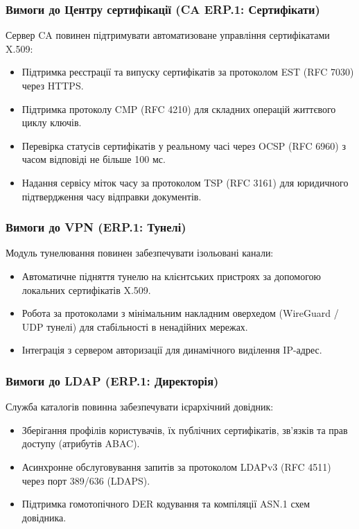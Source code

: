 \documentclass{article}
\begin{document}
\subsubsection{Вимоги до Центру сертифікації (CA ERP.1: Сертифікати)}
Сервер CA повинен підтримувати автоматизоване управління сертифікатами X.509:
\begin{itemize}
    \item Підтримка реєстрації та випуску сертифікатів за протоколом EST (RFC 7030) через HTTPS.
    \item Підтримка протоколу CMP (RFC 4210) для складних операцій життєвого циклу ключів.
    \item Перевірка статусів сертифікатів у реальному часі через OCSP (RFC 6960) з часом відповіді не більше 100 мс.
    \item Надання сервісу міток часу за протоколом TSP (RFC 3161) для юридичного підтвердження часу відправки документів.
\end{itemize}

\subsubsection{Вимоги до VPN (ERP.1: Тунелі)}
Модуль тунелювання повинен забезпечувати ізольовані канали:
\begin{itemize}
    \item Автоматичне підняття тунелю на клієнтських пристроях за допомогою локальних сертифікатів X.509.
    \item Робота за протоколами з мінімальним накладним оверхедом (WireGuard / UDP тунелі) для стабільності в ненадійних мережах.
    \item Інтеграція з сервером авторизації для динамічного виділення IP-адрес.
\end{itemize}

\subsubsection{Вимоги до LDAP (ERP.1: Директорія)}
Служба каталогів повинна забезпечувати ієрархічний довідник:
\begin{itemize}
    \item Зберігання профілів користувачів, їх публічних сертифікатів, зв'язків та прав доступу (атрибутів ABAC).
    \item Асинхронне обслуговування запитів за протоколом LDAPv3 (RFC 4511) через порт 389/636 (LDAPS).
    \item Підтримка гомотопічного DER кодування та компіляції ASN.1 схем довідника.
\end{itemize}
\end{document}
